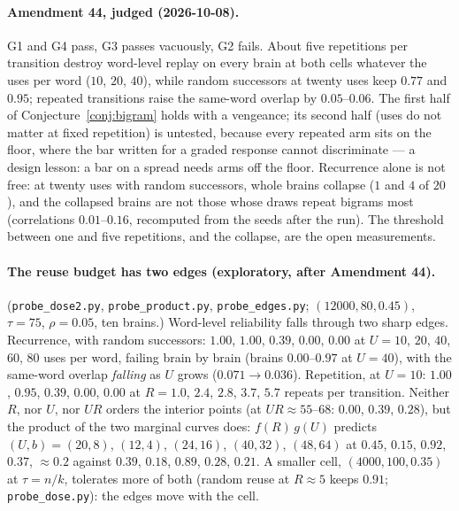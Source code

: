 \documentclass[11pt]{article}
\theoremstyle{definition}
\theoremstyle{plain}
\begin{document}
\paragraph{Amendment 44, judged (2026-10-08).} G1 and G4 pass, G3 passes
vacuously, G2 fails. About five repetitions per transition destroy word-level
replay on every brain at both cells whatever the uses per word ($10$, $20$,
$40$), while random successors at twenty uses keep $0.77$ and $0.95$; repeated
transitions raise the same-word overlap by $0.05$--$0.06$. The first half of
Conjecture~\ref{conj:bigram} holds with a vengeance; its second half (uses do
not matter at fixed repetition) is untested, because every repeated arm sits
on the floor, where the bar written for a graded response cannot
discriminate --- a design lesson: a bar on a spread needs arms off the floor.
Recurrence alone is not free: at twenty uses with random successors, whole
brains collapse ($1$ and $4$ of $20$), and the collapsed brains are not those
whose draws repeat bigrams most (correlations $0.01$--$0.16$, recomputed from
the seeds after the run). The threshold between one and five repetitions, and
the collapse, are the open measurements.

\paragraph{The reuse budget has two edges (exploratory, after Amendment 44).}
(\texttt{probe\_dose2.py}, \texttt{probe\_product.py},
\texttt{probe\_edges.py}; $(12000,80,0.45)$, $\tau = 75$, $\rho = 0.05$, ten
brains.) Word-level reliability falls through two sharp edges. Recurrence,
with random successors: $1.00$, $1.00$, $0.39$, $0.00$, $0.00$ at $U = 10$, $20$,
$40$, $60$, $80$ uses per word, failing brain by brain (brains $0.00$--$0.97$ at
$U = 40$), with the same-word overlap \emph{falling} as $U$ grows ($0.071 \to
0.036$). Repetition, at $U = 10$: $1.00$, $0.95$, $0.39$, $0.00$, $0.00$ at $R = 1.0$,
$2.4$, $2.8$, $3.7$, $5.7$ repeats per transition. Neither $R$, nor $U$, nor $UR$
orders the interior points (at $UR \approx 55$--$68$: $0.00$, $0.39$, $0.28$), but
the product of the two marginal curves does: $f(R)\,g(U)$ predicts $(U,b) =
(20,8)$, $(12,4)$, $(24,16)$, $(40,32)$, $(48,64)$ at $0.45$, $0.15$, $0.92$,
$0.37$, $\approx0.2$ against $0.39$, $0.18$, $0.89$, $0.28$, $0.21$. A smaller cell,
$(4000,100,0.35)$ at $\tau = n/k$, tolerates more of both (random reuse at
$R \approx 5$ keeps $0.91$; \texttt{probe\_dose.py}): the edges move with the cell.
\end{document}
